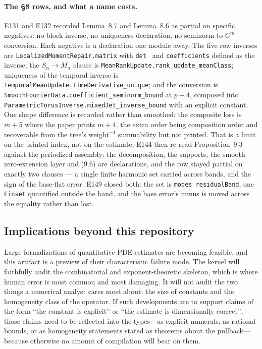 \documentclass[11pt]{article}
\newcommand{\ct}[1]{\texttt{#1}}
\theoremstyle{plain}
\theoremstyle{definition}
\theoremstyle{remark}
\begin{document}
\paragraph{The §8 rows, and what a name costs.} E131 and E132 recorded Lemma~8.7 and
Lemma~8.6 as partial on specific negatives: no block inverse, no uniqueness declaration, no
seminorm-to-$C^m$ conversion. Each negative is a declaration one module away. The five-row inverses
are \ct{LocalizedMomentRepair.matrix} with \ct{det } and \ct{coefficients} defined as the
inverse; the $S_\alpha \to M_\alpha$ clause is \ct{MeanRankUpdate.rank\_update\_meanClass};
uniqueness of the temporal inverse is \ct{TemporalMeanUpdate.timeDerivative\_unique}; and the
conversion is \ct{SmoothFourierData.coefficient\_seminorm\_bound} at $p+4$, composed into
\ct{ParametricTorusInverse.mixedJet\_inverse\_bound} with an explicit constant. One shape
difference is recorded rather than smoothed: the composite loss is $m+5$ where the paper prints
$m+4$, the extra order being composition order and recoverable from the tree's
$\text{weight}^{-4}$ summability but not printed. That is a limit on the printed index, not on the
estimate. E144 then re-read Proposition~9.3 against the periodized assembly: the decomposition, the
supports, the smooth zero-extension layer and (9.6) are declarations, and the row stayed partial on
exactly two clauses --- a single finite harmonic set carried across bands, and the sign of the
base-flat error. E149 closed both: the set is \ct{modes residualBand}, one \ct{Finset} quantified
outside the band, and the base error's minus is moved across the equality rather than lost.

\subsection{Implications beyond this repository}

Large formalizations of quantitative PDE estimates are becoming feasible, and
this artifact is a preview of their characteristic failure mode. The kernel will
faithfully audit the combinatorial and exponent-theoretic skeleton, which is
where human error is most common and most damaging. It will not audit the two
things a numerical analyst cares most about: the size of constants and the
homogeneity class of the operator. If such developments are to support claims of
the form ``the constant is explicit'' or ``the estimate is dimensionally
correct'', those claims need to be reflected into the types---as explicit
numerals, as rational bounds, or as homogeneity statements stated as theorems
about the pullback---because otherwise no amount of compilation will bear on
them.
\end{document}
